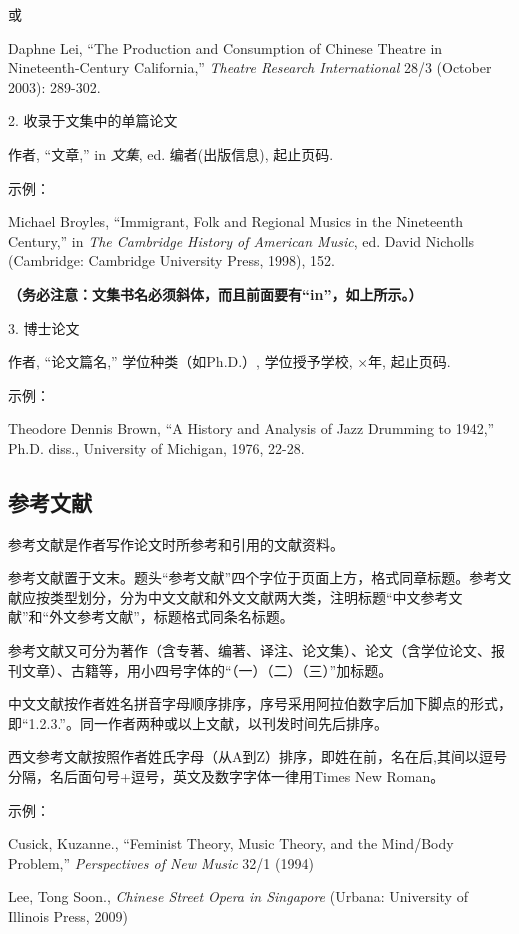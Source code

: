 或

Daphne Lei, “The Production and Consumption of Chinese Theatre in Nineteenth-Century California,” \textit{Theatre Research International} 28/3 (October 2003): 289-302.

2. 收录于文集中的单篇论文

作者, “文章,” in \textit{文集}, ed. 编者(出版信息), 起止页码.

示例：

Michael Broyles, “Immigrant, Folk and Regional Musics in the Nineteenth Century,” in \textit{The Cambridge History of American Music}, ed. David Nicholls (Cambridge: Cambridge University Press, 1998), 152.

\textbf{（务必注意：文集书名必须斜体，而且前面要有“in”，如上所示。）}

3. 博士论文

作者, “论文篇名,” 学位种类（如Ph.D.）, 学位授予学校, ×年, 起止页码.

示例：

Theodore Dennis Brown, “A History and Analysis of Jazz Drumming to 1942,” Ph.D. diss., University of Michigan, 1976, 22-28.

\subsection{参考文献}

参考文献是作者写作论文时所参考和引用的文献资料。

参考文献置于文末。题头“参考文献”四个字位于页面上方，格式同章标题。参考文献应按类型划分，分为中文文献和外文文献两大类，注明标题“中文参考文献”和“外文参考文献”，标题格式同条名标题。

参考文献又可分为著作（含专著、编著、译注、论文集）、论文（含学位论文、报刊文章）、古籍等，用小四号字体的“（一）（二）（三）”加标题。

中文文献按作者姓名拼音字母顺序排序，序号采用阿拉伯数字后加下脚点的形式，即“1.2.3.”。同一作者两种或以上文献，以刊发时间先后排序。

西文参考文献按照作者姓氏字母（从A到Z）排序，即姓在前，名在后,其间以逗号分隔，名后面句号+逗号，英文及数字字体一律用Times New Roman。

示例：

Cusick, Kuzanne., “Feminist Theory, Music Theory, and the Mind/Body Problem,” \textit{Perspectives of New Music} 32/1 (1994)

Lee, Tong Soon., \textit{Chinese Street Opera in Singapore} (Urbana: University of Illinois Press, 2009)

